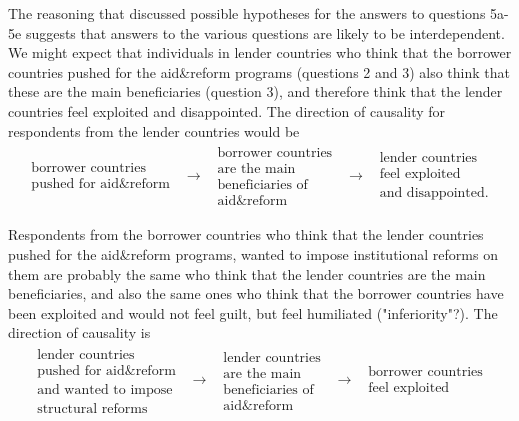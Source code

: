The reasoning that discussed possible hypotheses for the answers to
questions 5a-5e suggests that answers to the various questions are likely to
be interdependent. We might expect that individuals in lender countries who
think that the borrower countries pushed for the aid\&reform programs
(questions 2 and 3) also think that these are the main beneficiaries
(question 3), and therefore think that the lender countries feel exploited
and disappointed. The direction of causality for respondents from the lender
countries would be%
\begin{equation*}
\begin{array}{ccccc}
\begin{array}{c}
\text{borrower countries} \\ 
\text{pushed for aid\&reform}%
\end{array}
& \rightarrow  & 
\begin{array}{c}
\text{borrower countries} \\ 
\text{are the main} \\ 
\text{beneficiaries of} \\ 
\text{aid\&reform}%
\end{array}
& \rightarrow  & 
\begin{array}{c}
\text{lender countries} \\ 
\text{feel exploited} \\ 
\text{and disappointed.}%
\end{array}%
\end{array}%
\end{equation*}

Respondents from the borrower countries who think that the lender countries
pushed for the aid\&reform programs, wanted to impose institutional reforms
on them are probably the same who think that the lender countries are the
main beneficiaries, and also the same ones who think that the borrower
countries have been exploited and would not feel guilt, but feel humiliated
("inferiority"?). The direction of causality is%
\begin{equation*}
\begin{array}{ccccc}
\begin{array}{c}
\text{lender countries} \\ 
\text{pushed for aid\&reform} \\ 
\text{and wanted to impose} \\ 
\text{structural reforms}%
\end{array}
& \rightarrow  & 
\begin{array}{c}
\text{lender countries} \\ 
\text{are the main} \\ 
\text{beneficiaries of} \\ 
\text{aid\&reform}%
\end{array}
& \rightarrow  & 
\begin{array}{c}
\text{borrower countries} \\ 
\text{feel exploited}%
\end{array}%
\end{array}%
\end{equation*}

\\
